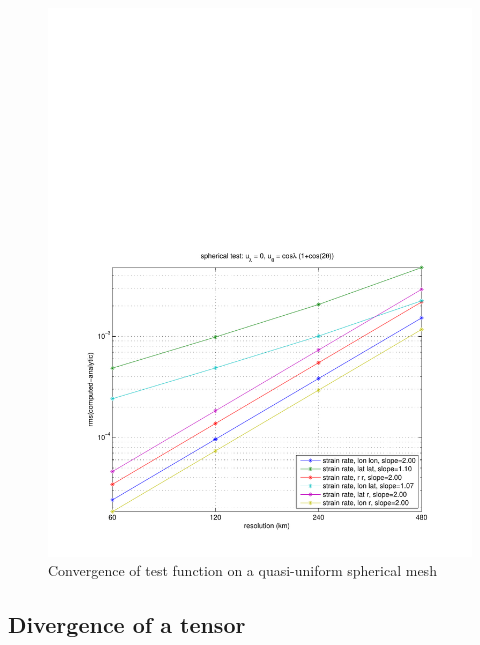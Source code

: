 \documentclass[11pt]{report}
\begin{document}
\begin{figure}[htbp]
 \center
 \includegraphics[scale=0.8, trim = 0 0 0 4in, clip]{f/a19_sph_conv_test_2.pdf}
 \caption{Convergence of test function on a quasi-uniform spherical mesh}
 \label{fig:convergence2}
\end{figure}


\subsection{Divergence of a tensor}
\end{document}
